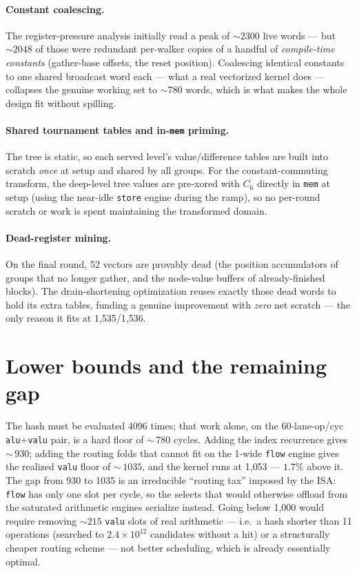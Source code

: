 \documentclass[11pt]{article}
\newcommand{\code}[1]{\texttt{#1}}
\begin{document}
\paragraph{Constant coalescing.} The register-pressure analysis initially read
a peak of ${\sim}2300$ live words --- but ${\sim}2048$ of those were redundant
per-walker copies of a handful of \emph{compile-time constants} (gather-base
offsets, the reset position). Coalescing identical constants to one shared
broadcast word each --- what a real vectorized kernel does --- collapses the
genuine working set to ${\sim}780$ words, which is what makes the whole design
fit without spilling.

\paragraph{Shared tournament tables and in-\code{mem} priming.} The tree is
static, so each served level's value/difference tables are built into scratch
\emph{once} at setup and shared by all groups. For the constant-commuting
transform, the deep-level tree values are pre-xored with $C_6$ directly in
\code{mem} at setup (using the near-idle \code{store} engine during the ramp),
so no per-round scratch or work is spent maintaining the transformed domain.

\paragraph{Dead-register mining.} On the final round, 52 vectors are provably
dead (the position accumulators of groups that no longer gather, and the
node-value buffers of already-finished blocks). The drain-shortening
optimization reuses exactly those dead words to hold its extra tables, funding
a genuine improvement with \emph{zero} net scratch --- the only reason it fits
at 1{,}535/1{,}536.

\section{Lower bounds and the remaining gap}

The hash must be evaluated 4096 times; that work alone, on the 60-lane-op/cyc
\code{alu}${+}$\code{valu} pair, is a hard floor of ${\sim}\,780$ cycles.
Adding the index recurrence gives ${\sim}\,930$; adding the routing folds that
cannot fit on the 1-wide \code{flow} engine gives the realized \code{valu}
floor of ${\sim}\,1035$, and the kernel runs at 1{,}053 --- $1.7\%$ above it.
The gap from 930 to 1035 is an irreducible ``routing tax'' imposed by the
ISA: \code{flow} has only one slot per cycle, so the selects that would
otherwise offload from the saturated arithmetic engines serialize instead.
Going below 1{,}000 would require removing ${\sim}215$ \code{valu} slots of
real arithmetic --- i.e.\ a hash shorter than 11 operations (searched to
$2.4\times10^{12}$ candidates without a hit) or a structurally cheaper
routing scheme --- not better scheduling, which is already essentially
optimal.
\end{document}
